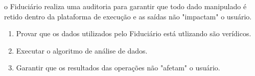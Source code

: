 o Fiduciário realiza uma auditoria para garantir que todo dado manipulado é retido dentro da plataforma de execução e as saídas não "impactam" o usuário.

\begin{enumerate}
    \item Provar que os dados utilizados pelo Fiduciário está utlizando são verídicos. 
    \item Executar o algoritmo de análise de dados.
    \item Garantir que os resultados das operações não "afetam" o usuário.
\end{enumerate}
